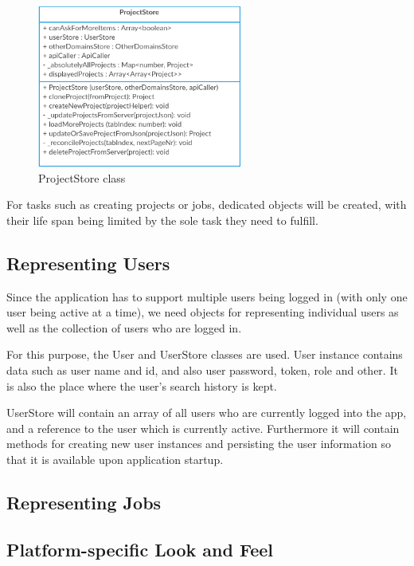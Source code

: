 \begin{figure}[H]
	\includegraphics[width=0.6\textwidth]{pics/ProjectStore}
	\caption{ProjectStore class}
	\label{projectStore}
\end{figure}

For tasks such as creating projects or jobs, dedicated objects will be created, with their life span being limited by the sole task they need to fulfill.

\subsection{Representing Users}

Since the application has to support multiple users being logged in (with only one user being active at a time), we need objects for representing individual users as well as the collection of users who are logged in.

For this purpose, the User and UserStore classes are used. User instance contains data such as user name and id, and also user password, token, role and other. It is also the place where the user's search history is kept.

UserStore will contain an array of all users who are currently logged into the app, and a reference to the user which is currently active. Furthermore it will contain methods for creating new user instances and persisting the user information so that it is available upon application startup.


\subsection{Representing Jobs}




\subsection{Platform-specific Look and Feel}

